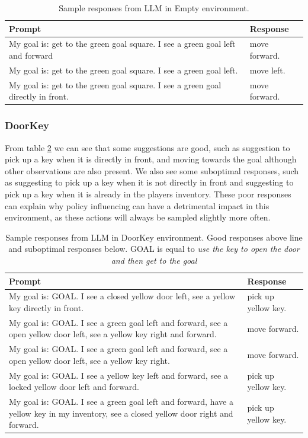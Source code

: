 \documentclass[conference]{IEEEtran}
\begin{document}
\begin{table}[h]
\caption{Sample responses from LLM in Empty environment.}
\begin{center}
\label{emptyresponses}
\begin{tabularx}{3.25in}{X | X}
Prompt & Response \\
\hline
My goal is: get to the green goal square. I see a green goal left and forward & move forward. \\
My goal is: get to the green goal square. I see a green goal left. & move left. \\
My goal is: get to the green goal square. I see a green goal directly in front. & move forward.
\end{tabularx}
\end{center}
\end{table}

\subsubsection{DoorKey}

From table \ref{doorkeyresponses} we can see that some suggestions are good, such as suggestion to pick up a key when it is directly in front, and moving towards the goal although other observations are also present. We also see some suboptimal responses, such as suggesting to pick up a key when it is not directly in front and suggesting to pick up a key when it is already in the players inventory. These poor responses can explain why policy influencing can have a detrimental impact in this environment, as these actions will always be sampled slightly more often.

\begin{table}[h]
\caption{Sample responses from LLM in DoorKey environment. Good responses above line and suboptimal responses below. GOAL is equal to {\it use the key to open the door and then get to the goal}}
\begin{center}
\label{doorkeyresponses}
\begin{tabularx}{3.25in}{X | X}
Prompt & Response \\
\hline
My goal is: GOAL. I see a closed yellow door left, see a yellow key directly in front. & pick up yellow key. \\
My goal is: GOAL. I see a green goal left and forward, see a open yellow door left, see a yellow key right and forward. & move forward. \\
My goal is: GOAL. I see a green goal left and forward, see a open yellow door left, see a yellow key right. & move forward. \\
\hline
My goal is: GOAL. I see a yellow key left and forward, see a locked yellow door left and forward. & pick up yellow key. \\
My goal is: GOAL. I see a green goal left and forward, have a yellow key in my inventory, see a closed yellow door right and forward. & pick up yellow key.
\end{tabularx}
\end{center}
\end{table}
\end{document}
